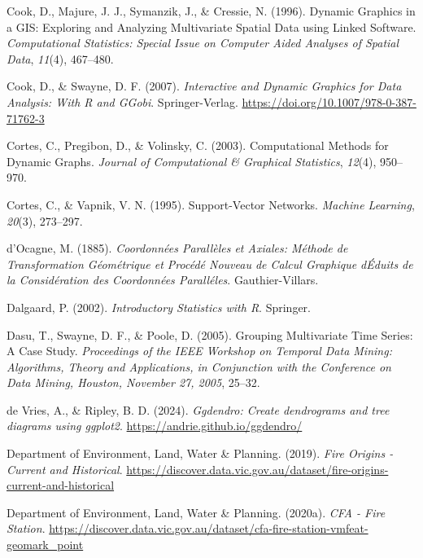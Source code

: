 \documentclass[
  letterpaper,
]{krantz}
\newlength{\cslhangindent}
\newenvironment{CSLReferences}[2] %
 {\begin{list}{}{%
  \setlength{\itemindent}{0pt}
  \setlength{\leftmargin}{0pt}
  \setlength{\parsep}{0pt}
  \ifodd #1
   \setlength{\leftmargin}{\cslhangindent}
   \setlength{\itemindent}{-1\cslhangindent}
  \fi
  \setlength{\itemsep}{#2\baselineskip}}}
 {\end{list}}
\begin{document}
\begin{CSLReferences}{1}{0}
Cook, D., Majure, J. J., Symanzik, J., \& Cressie, N. (1996). {D}ynamic
{G}raphics in a {GIS}: {E}xploring and {A}nalyzing {M}ultivariate
{S}patial {D}ata using {L}inked {S}oftware. \emph{Computational
Statistics: Special Issue on Computer Aided Analyses of Spatial Data},
\emph{11}(4), 467--480.

Cook, D., \& Swayne, D. F. (2007). \emph{Interactive and {D}ynamic
{G}raphics for {D}ata {A}nalysis: {W}ith {R} and {GGobi}}.
Springer-Verlag. \url{https://doi.org/10.1007/978-0-387-71762-3}

Cortes, C., Pregibon, D., \& Volinsky, C. (2003). Computational
{M}ethods for {D}ynamic {G}raphs. \emph{Journal of Computational \&
Graphical Statistics}, \emph{12}(4), 950--970.

Cortes, C., \& Vapnik, V. N. (1995). Support-{V}ector {N}etworks.
\emph{Machine Learning}, \emph{20}(3), 273--297.

d'Ocagne, M. (1885). \emph{{C}oordonnées {P}arallèles et {A}xiales:
{M}éthode de {T}ransformation {G}éométrique et {P}rocédé {N}ouveau de
{C}alcul {G}raphique dÉduits de la {C}onsidération des {C}oordonnées
{P}aralléles}. Gauthier-Villars.

Dalgaard, P. (2002). \emph{Introductory {S}tatistics with {R}}.
Springer.

Dasu, T., Swayne, D. F., \& Poole, D. (2005). Grouping {M}ultivariate
{T}ime {S}eries: A {C}ase {S}tudy. \emph{Proceedings of the IEEE
Workshop on {T}emporal {D}ata {M}ining: {A}lgorithms, {T}heory and
{A}pplications, in Conjunction with the Conference on Data Mining,
Houston, November 27, 2005}, 25--32.

de Vries, A., \& Ripley, B. D. (2024). \emph{Ggdendro: Create
dendrograms and tree diagrams using ggplot2}.
\url{https://andrie.github.io/ggdendro/}

Department of Environment, Land, Water \& Planning. (2019). \emph{{Fire
Origins - Current and Historical}}.
\url{https://discover.data.vic.gov.au/dataset/fire-origins-current-and-historical}

Department of Environment, Land, Water \& Planning. (2020a). \emph{{CFA
- Fire Station}}.
\url{https://discover.data.vic.gov.au/dataset/cfa-fire-station-vmfeat-geomark_point}


\end{CSLReferences}
\end{document}
